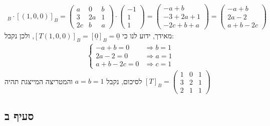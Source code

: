 \documentclass{article}
\def\zerovec{\underline{0}}
\begin{document}
\begin{align*}
    [T]_B \cdot [(1,0,0)]_B =
    \begin{pmatrix}
        a  & 0  & b \\
        3  & 2a & 1 \\
        2c & b  & a
    \end{pmatrix} \cdot \begin{pmatrix}
        -1 \\
        1  \\
        1
    \end{pmatrix}=
    \begin{pmatrix}
        -a + b      \\
        -3 + 2a + 1 \\
        -2c + b + a
    \end{pmatrix}=
    \begin{pmatrix}
        -a + b \\
        2a - 2 \\
        a + b -2c
    \end{pmatrix}
\end{align*}
מאידך, ידוע לנו כי $[T(1,0,0)]_B=[\zerovec]_B=\zerovec$, ולכן נקבל:
\begin{align*}
    \begin{cases}
        -a+b=0     & \Rightarrow b=1 \\
        2a-2=0     & \Rightarrow a=1 \\
        a+b-2c = 0 & \Rightarrow c=1
    \end{cases}
\end{align*}
לסיכום, נקבל $a=b=1$ והמטריצה המייצגת תהיה $[T]_B=\begin{pmatrix}
        1 & 0 & 1 \\
        3 & 2 & 1 \\
        2 & 1 & 1
    \end{pmatrix}$

\subsection*{סעיף ב}
\end{document}
